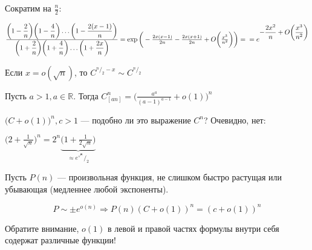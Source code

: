 \begin{enumerate}
Сократим на $\frac n 2 $:

$
\frac {\displaystyle\bigg ( 1- \frac 2 n \bigg ) \bigg ( 1 - \frac 4 n \bigg) \dots \bigg ( 1 - \frac {2(x-1)} n \bigg)} {\displaystyle \bigg (1 + \frac 2 n \bigg ) \bigg (1 + \frac 4 n\bigg) \dots \bigg ( 1 + \frac {2x} n \bigg )} = \exp \bigg(  -\frac {2x (x-1)} {2n} - \frac {2x(x+1)} {2n} + O\bigg(\frac {x^3} {n^2}\bigg) \bigg) = \\
= e^ {\displaystyle - \frac {2x^2} n +  O\bigg(\frac {x^3} {n^2}\bigg)}
$

\begin{cor}
Если $x = o(\sqrt{n}) $, то $\displaystyle C^{\displaystyle^n /_2-x}\sim C^{\displaystyle^n /_2}$
\end{cor}
\end{enumerate}
\newcommand\realset{\mathbb{R}}
\begin{thm}
Пусть $a > 1, a \in \realset$. Тогда $ C ^n _ {[an]} = \bigg ( \frac {a ^a} {(a-1)^{a-1}} + o(1)\bigg)^n$
\end{thm}

\begin{rem}
$\bigg(C+ o(1) \bigg) ^n, c > 1$ --- подобно ли это выражение $C^n $? Очевидно, нет:

$\bigg (2 + \frac 1 {\sqrt n} \bigg ) ^ n  = 2^n \underbrace {\bigg(1+\frac 1 {2 \sqrt n } \bigg )} _{\displaystyle \approx e^{^{\sqrt n}} / _2}$

\end{rem}


\begin{rem} Пусть $P(n)$ --- произвольная функция, не слишком быстро растущая или убывающая (медленнее любой экспоненты).

\[ P \sim \pm e ^ {o(n)} \Rightarrow  P(n)(C + o(1) )^n = (c + o(1) ) ^n \]

Обратите внимание, $o(1) $ в левой и правой частях формулы внутри себя содержат различные функции!
\end{rem}

